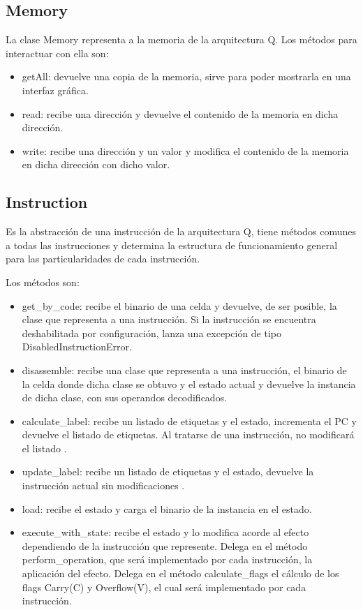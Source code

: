 \subsection{Memory}
La clase Memory representa a la memoria de la arquitectura Q. Los métodos para interactuar con ella son:

\begin{itemize}
\item getAll: devuelve una copia de la memoria, sirve para poder mostrarla en una interfaz gráfica.
\item read: recibe una dirección y devuelve el contenido de la memoria en dicha dirección.
\item write: recibe una dirección y un valor y modifica el contenido de la memoria en dicha dirección con dicho valor.
\end{itemize}

\subsection{Instruction}
Es la abstracción de una instrucción de la arquitectura Q, tiene métodos comunes a todas las instrucciones y determina la estructura de funcionamiento general para las particularidades de cada instrucción.

Los métodos son:
\begin{itemize}
\item get\_by\_code: recibe el binario de una celda y devuelve, de ser posible, la clase que representa a una instrucción. Si la instrucción se encuentra deshabilitada por configuración, lanza una excepción de tipo DisabledInstructionError.
\item disassemble: recibe una clase que representa a una instrucción, el binario de la celda donde dicha clase se obtuvo y el estado actual y devuelve la instancia de dicha clase, con sus operandos decodificados.
\item calculate\_label: recibe un listado de etiquetas y el estado, incrementa el PC y devuelve el listado de etiquetas. Al tratarse de una instrucción, no modificará el listado .
\item update\_label: recibe un listado de etiquetas y el estado, devuelve la instrucción actual sin modificaciones . 
\item load: recibe el estado y carga el binario de la instancia en el estado.
\item execute\_with\_state: recibe el estado y lo modifica acorde al efecto dependiendo de la instrucción que represente. Delega en el método perform\_operation, que será implementado por cada instrucción, la aplicación del efecto. Delega en el método calculate\_flags el cálculo de los flags Carry(C) y Overflow(V), el cual será implementado por cada instrucción.
\end{itemize}

